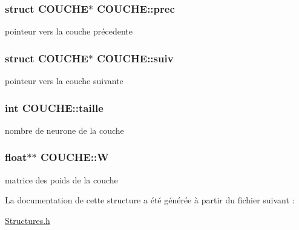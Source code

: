 \subsubsection[{\texorpdfstring{prec}{prec}}]{\setlength{\rightskip}{0pt plus 5cm}struct {\bf C\+O\+U\+C\+HE}$\ast$ C\+O\+U\+C\+H\+E\+::prec}\hypertarget{structCOUCHE_ada93a5c424f0cc1b52d549866ffcd6f9}{}\label{structCOUCHE_ada93a5c424f0cc1b52d549866ffcd6f9}
pointeur vers la couche précedente 
\subsubsection[{\texorpdfstring{suiv}{suiv}}]{\setlength{\rightskip}{0pt plus 5cm}struct {\bf C\+O\+U\+C\+HE}$\ast$ C\+O\+U\+C\+H\+E\+::suiv}\hypertarget{structCOUCHE_a17139b5e6dd8e69f1704d902742085cc}{}\label{structCOUCHE_a17139b5e6dd8e69f1704d902742085cc}
pointeur vers la couche suivante 
\subsubsection[{\texorpdfstring{taille}{taille}}]{\setlength{\rightskip}{0pt plus 5cm}int C\+O\+U\+C\+H\+E\+::taille}\hypertarget{structCOUCHE_af841b5acbf63ea3b57522ce796497719}{}\label{structCOUCHE_af841b5acbf63ea3b57522ce796497719}
nombre de neurone de la couche 
\subsubsection[{\texorpdfstring{W}{W}}]{\setlength{\rightskip}{0pt plus 5cm}float$\ast$$\ast$ C\+O\+U\+C\+H\+E\+::W}\hypertarget{structCOUCHE_a73df475e85bcea1ab23f681777d2ca2b}{}\label{structCOUCHE_a73df475e85bcea1ab23f681777d2ca2b}
matrice des poids de la couche 

La documentation de cette structure a été générée à partir du fichier suivant \+:\begin{DoxyCompactItemize}
\item 
\hyperlink{Structures_8h}{Structures.\+h}\end{DoxyCompactItemize}
